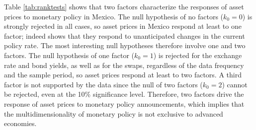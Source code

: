 \documentclass[a4paper, 12pt]{article}
\providecommand{\dimfactors}{k}
\providecommand{\dimnull}{\dimfactors_{0}}
\begin{document}
Table \ref{tab:ranktests} shows that two factors characterize the responses of asset prices to monetary policy in Mexico. The null hypothesis of no factors (\(\dimnull = 0\)) is strongly rejected in all cases, so asset prices in Mexico respond at least to one factor; \textcite{Solis:FX} indeed shows that they respond to unanticipated changes in the current policy rate. The most interesting null hypotheses therefore involve one and two factors. 
The null hypothesis of one factor (\(\dimnull = 1\)) is rejected for the exchange rate and bond yields, as well as for the swaps, regardless of the data frequency and the sample period, so asset prices respond at least to two factors. A third factor is not supported by the data since the null of two factors (\(\dimnull = 2\)) cannot be rejected, even at the 10\% significance level. 
Therefore, two factors drive the response of asset prices to monetary policy announcements, which implies that the multidimensionality of monetary policy \parencite{GSS:2005a, Altavillaetal:2019,Swanson:2021} is not exclusive to advanced economies. 
\end{document}
